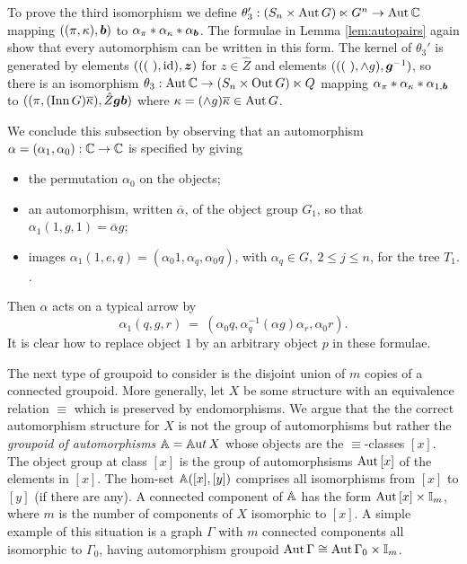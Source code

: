 \begin{pf}
\medskip 
To prove the third isomorphism we define 
$\theta_3' : (S_n \times \mathrm{Aut}\,G) \ltimes G^n \to \mathrm{Aut}\,\mathbb{C}$ 
mapping $((\pi,\kappa),\boldsymbol{b})$ 
to $\alpha_{\pi}*\alpha_{\kappa}*\alpha_{\boldsymbol{b}}$. 
The formulae in Lemma \ref{lem:autopairs} again show that every 
automorphism can be written in this form. 
The kernel of $\theta_3'$ is generated by elements 
$(((~),\mathrm{id}),\boldsymbol{z})$ for $z \in \hat{Z}$ 
and elements $(((~),\wedge  g),\boldsymbol{g}^{-1})$, 
so there is an isomorphism 
$\theta_3 : \mathrm{Aut}\,\mathbb{C} \to (S_n \times \mathrm{Out}\,G) \ltimes Q$ 
mapping $\alpha_{\pi}*\alpha_{\kappa}*\alpha_{1,\boldsymbol{b}}$ 
to $((\pi,(\mathrm{Inn}\,G)\overline{\kappa}),\hat{Z}\boldsymbol{g}\boldsymbol{b})$ 
where $\kappa = (\wedge  g)\overline{\kappa} \in \mathrm{Aut}\,G$. 
\end{pf}

\bigskip
We conclude this subsection by observing that an automorphism 
$\alpha = (\alpha_1,\alpha_0) : \mathbb{C} \to \mathbb{C}$ is specified by giving 
\begin{itemize}
\item
the permutation $\alpha_0$ on the objects; 
\item
an automorphism, written $\overline{\alpha}$, of the object group $G_1$, 
so that $\alpha_1(1,g,1) = \overline{\alpha} g$; 
\item
images $\alpha_1(1,e,q) = (\alpha_0 1, \alpha_q, \alpha_0 q)$, 
with $\alpha_q \in G,~ 2 \leqslant j \leqslant n$, 
for the tree $T_1$. . 
\end{itemize}
Then $\alpha$ acts on a typical arrow by 
$$
\alpha_1(q,g,r) ~=~ (\alpha_0 q, \alpha_q^{-1}(\alpha g)\alpha_r, \alpha_0 r). 
$$
It is clear how to replace object $1$ by an arbitrary object $p$ 
in these formulae. 


\bigskip
The next type of groupoid to consider is the disjoint union of $m$ 
copies of a connected groupoid. 
More generally, let $X$ be some structure with an equivalence relation 
$\equiv$ which is preserved by endomorphisms. 
We argue that the the correct automorphism structure for $X$ is not the 
group of automorphisms but rather the \emph{groupoid of automorphisms} 
$\mathbb{A} = \mathbb{A}{\mathrm ut}\,X$ whose objects are the $\equiv$-classes $[x]$. 
The object group at class $[x]$ is the group of automorphsisms 
$\mathrm{Aut}\,[x]$ of the elements in $[x]$. 
The hom-set $\mathbb{A}([x],[y])$ comprises all isomorphisms from $[x]$ 
to $[y]$ (if there are any). 
A connected component of $\mathbb{A}$ has the form $\mathrm{Aut}\,[x] \times \mathbb{I}_m$, 
where $m$ is the number of components of $X$ isomorphic to $[x]$. 
A simple example of this situation is a graph $\Gamma$ with $m$ 
connected components all isomorphic to $\Gamma_0$, having 
automorphism groupoid $\mathrm{Aut}\,\Gamma \cong \mathrm{Aut}\,\Gamma_0 \times \mathbb{I}_m$. 

